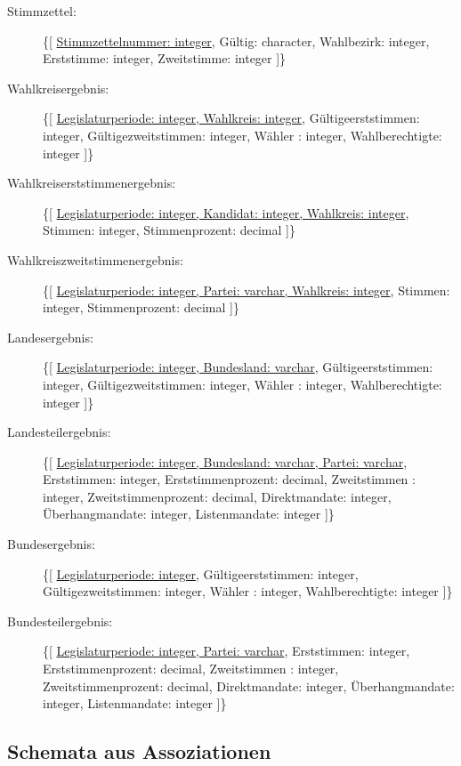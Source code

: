 \documentclass[a4paper]{article}
\begin{document}
\begin{description}
\item[Stimmzettel:] \{[ \underline{Stimmzettelnummer: integer}, Gültig: character, Wahlbezirk: integer, Erststimme: integer, Zweitstimme: integer ]\}

\item[Wahlkreisergebnis:] \{[ \underline{Legislaturperiode: integer, Wahlkreis: integer}, Gültigeerststimmen: integer, Gültigezweitstimmen: integer, Wähler : integer, Wahlberechtigte: integer ]\}

\item[Wahlkreiserststimmenergebnis:] \{[ \underline{Legislaturperiode: integer, Kandidat: integer, Wahlkreis: integer}, Stimmen: integer, Stimmenprozent: decimal ]\}

\item[Wahlkreiszweitstimmenergebnis:] \{[ \underline{Legislaturperiode: integer, Partei: varchar, Wahlkreis: integer}, Stimmen: integer, Stimmenprozent: decimal ]\}

\item[Landesergebnis:] \{[ \underline{Legislaturperiode: integer, Bundesland: varchar}, Gültigeerststimmen: integer, Gültigezweitstimmen: integer, Wähler : integer, Wahlberechtigte: integer ]\}

\item[Landesteilergebnis:] \{[ \underline{Legislaturperiode: integer, Bundesland: varchar, Partei: varchar}, Erststimmen: integer, Erststimmenprozent: decimal, Zweitstimmen : integer, Zweitstimmenprozent: decimal, Direktmandate: integer, Überhangmandate: integer, Listenmandate: integer ]\}

\item[Bundesergebnis:] \{[ \underline{Legislaturperiode: integer}, Gültigeerststimmen: integer, Gültigezweitstimmen: integer, Wähler : integer, Wahlberechtigte: integer ]\}

\item[Bundesteilergebnis:] \{[ \underline{Legislaturperiode: integer, Partei: varchar}, Erststimmen: integer, Erststimmenprozent: decimal, Zweitstimmen : integer, Zweitstimmenprozent: decimal, Direktmandate: integer, Überhangmandate: integer, Listenmandate: integer ]\}

\end{description}

\subsection{Schemata aus Assoziationen}
\end{document}
